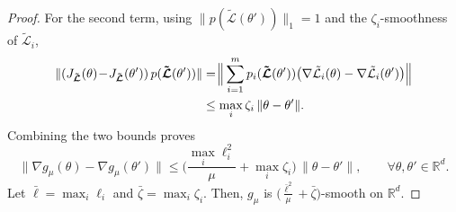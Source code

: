 \documentclass[10pt,a4paper]{amsart}
\renewcommand{\footnote}[1]{}
\begin{document}
\begin{proof}
For the second term, using $\|p(\boldsymbol{\tilde{\mathcal{L}}}(\theta'))\|_1=1$ and the $\zeta_i$-smoothness of $\tilde{\mathcal{L}}_i$,
\begin{align}
\|(J_{\boldsymbol{\tilde{\mathcal{L}}}}(\theta)\!-\!J_{\boldsymbol{\tilde{\mathcal{L}}}}(\theta'))\,p(\boldsymbol{\tilde{\mathcal{L}}}(\theta'))\|&=\!
\Big\|\sum_{i=1}^m p_i(\boldsymbol{\tilde{\mathcal{L}}}(\theta'))\big(\nabla \tilde{\mathcal{L}}_i(\theta)-\nabla \tilde{\mathcal{L}}_i(\theta')\big)\Big\| \notag\\
&\le \max_i \zeta_i \,\|\theta-\theta'\|\notag.
\end{align}
Combining the two bounds proves
\[
\|\nabla g_\mu(\theta)-\nabla g_\mu(\theta')\|
\le
\Big(\frac{\max_i \ell_i^2}{\mu}+\max_i \zeta_i\Big)\,\|\theta-\theta'\|,
\qquad \forall \theta,\theta'\in \mathbb{R}^d.
\]
Let $\bar{\ell}=\max_{i}\ell_i$ and $\bar{\zeta}=\max_{i}\zeta_i$. Then, $g_{\mu}$ is $\Big(\frac{\bar{\ell}^2}{\mu}+\bar{\zeta}\Big)$-smooth on $\mathbb{R}^d$.
\end{proof}
\end{document}
